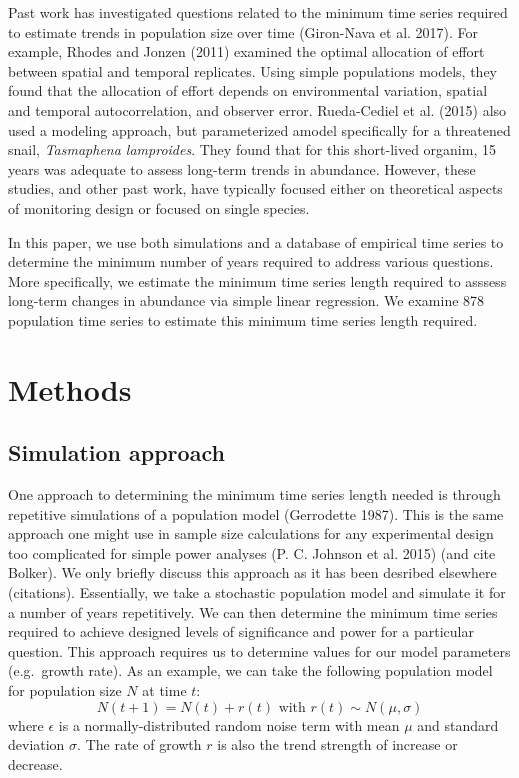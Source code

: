 \documentclass[12pt,]{article}
\begin{document}
Past work has investigated questions related to the minimum time series
required to estimate trends in population size over time (Giron-Nava et
al. 2017). For example, Rhodes and Jonzen (2011) examined the optimal
allocation of effort between spatial and temporal replicates. Using
simple populations models, they found that the allocation of effort
depends on environmental variation, spatial and temporal
autocorrelation, and observer error. Rueda-Cediel et al. (2015) also
used a modeling approach, but parameterized amodel specifically for a
threatened snail, \emph{Tasmaphena lamproides}. They found that for this
short-lived organim, 15 years was adequate to assess long-term trends in
abundance. However, these studies, and other past work, have typically
focused either on theoretical aspects of monitoring design or focused on
single species.

In this paper, we use both simulations and a database of empirical time
series to determine the minimum number of years required to address
various questions. More specifically, we estimate the minimum time
series length required to asssess long-term changes in abundance via
simple linear regression. We examine 878 population time series to
estimate this minimum time series length required.

\section{Methods}\label{methods}

\subsection{Simulation approach}\label{simulation-approach}

One approach to determining the minimum time series length needed is
through repetitive simulations of a population model (Gerrodette 1987).
This is the same approach one might use in sample size calculations for
any experimental design too complicated for simple power analyses (P. C.
Johnson et al. 2015) (and cite Bolker). We only briefly discuss this
approach as it has been desribed elsewhere (citations). Essentially, we
take a stochastic population model and simulate it for a number of years
repetitively. We can then determine the minimum time series required to
achieve designed levels of significance and power for a particular
question. This approach requires us to determine values for our model
parameters (e.g.~growth rate). As an example, we can take the following
population model for population size \(N\) at time \(t\): \[
N(t + 1) = N(t) + r(t) \mbox{ with } r(t) \sim N(\mu, \sigma)
\] where \(\epsilon\) is a normally-distributed random noise term with
mean \(\mu\) and standard deviation \(\sigma\). The rate of growth \(r\)
is also the trend strength of increase or decrease.
\end{document}
